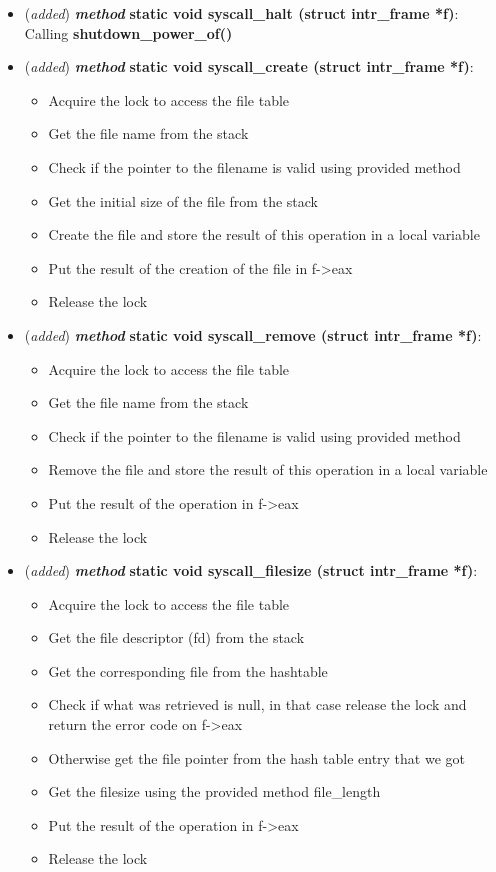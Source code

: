 \documentclass[11pt]{scrartcl}
\begin{document}
\begin{itemize}
    \item (\textit{added}) \textbf{\textit{method}} \textbf{static void
syscall\_halt (struct intr\_frame *f)}: Calling \textbf{shutdown\_power\_of()}

    \item (\textit{added}) \textbf{\textit{method}} \textbf{static void
syscall\_create (struct intr\_frame *f)}:
\begin{itemize}
    \item[] Acquire the lock to access the file table 
    \item[] Get the file name from the stack
    \item[] Check if the pointer to the filename is valid using provided method
    \item[] Get the initial size of the file from the stack
    \item[] Create the file and store the result of this operation in a local variable
    \item[] Put the result of the creation of the file in f->eax 
    \item[] Release the lock
\end{itemize}

    \item (\textit{added}) \textbf{\textit{method}} \textbf{static void
syscall\_remove (struct intr\_frame *f)}:
\begin{itemize}
    \item[] Acquire the lock to access the file table 
    \item[] Get the file name from the stack
    \item[] Check if the pointer to the filename is valid using provided method
    \item[] Remove the file and store the result of this operation in a local variable
    \item[] Put the result of the operation in f->eax 
    \item[] Release the lock
\end{itemize}

    \item (\textit{added}) \textbf{\textit{method}} \textbf{static void
syscall\_filesize (struct intr\_frame *f)}:
\begin{itemize}
    \item[] Acquire the lock to access the file table 
    \item[] Get the file descriptor (fd) from the stack
    \item[] Get the corresponding file from the hashtable
    \item[] Check if what was retrieved is null, in that case release the lock and return the error code on f->eax
    \item[] Otherwise get the file pointer from the hash table entry that we got
    \item[] Get the filesize using the provided method file\_length
    \item[] Put the result of the operation in f->eax 
    \item[] Release the lock
\end{itemize}


\end{itemize}
\end{document}
